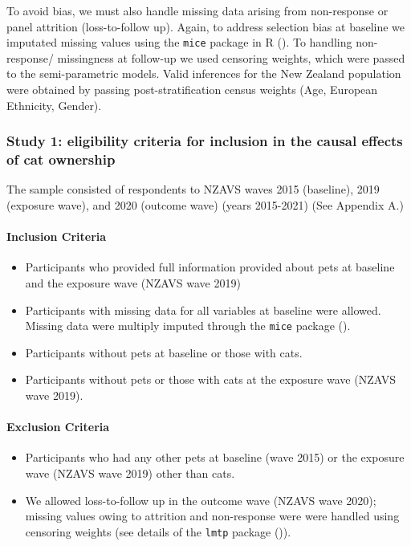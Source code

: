 \documentclass[
  singlecolumn,
  9pt]{article}
\let\oldparagraph\paragraph
\renewcommand{\paragraph}[1]{\oldparagraph{#1}\mbox{}}
\providecommand{\tightlist}{%
  \setlength{\itemsep}{0pt}\setlength{\parskip}{0pt}}\usepackage{longtable,booktabs,array}
\begin{document}
To avoid bias, we must also handle missing data arising from
non-response or panel attrition (loss-to-follow up). Again, to address
selection bias at baseline we imputated missing values using the
\texttt{mice} package in R (). To handling non-response/ missingness at follow-up we used
censoring weights, which were passed to the semi-parametric models.
Valid inferences for the New Zealand population were obtained by passing
post-stratification census weights (Age, European Ethnicity, Gender).

\subsubsection{Study 1: eligibility criteria for inclusion in the causal
effects of cat
ownership}\label{study-1-eligibility-criteria-for-inclusion-in-the-causal-effects-of-cat-ownership}

The sample consisted of respondents to NZAVS waves 2015 (baseline), 2019
(exposure wave), and 2020 (outcome wave) (years 2015-2021) (See Appendix
A.)

\paragraph{Inclusion Criteria}\label{inclusion-criteria}

\begin{itemize}
\tightlist
\item
  Participants who provided full information provided about pets at
  baseline and the exposure wave (NZAVS wave 2019)
\item
  Participants with missing data for all variables at baseline were
  allowed. Missing data were multiply imputed through the \texttt{mice}
  package ().
\item
  Participants without pets at baseline or those with cats.
\item
  Participants without pets or those with cats at the exposure wave
  (NZAVS wave 2019).
\end{itemize}

\paragraph{Exclusion Criteria}\label{exclusion-criteria}

\begin{itemize}
\tightlist
\item
  Participants who had any other pets at baseline (wave 2015) or the
  exposure wave (NZAVS wave 2019) other than cats.
\item
  We allowed loss-to-follow up in the outcome wave (NZAVS wave 2020);
  missing values owing to attrition and non-response were were handled
  using censoring weights (see details of the \texttt{lmtp} package
  ()).
\end{itemize}
\end{document}

